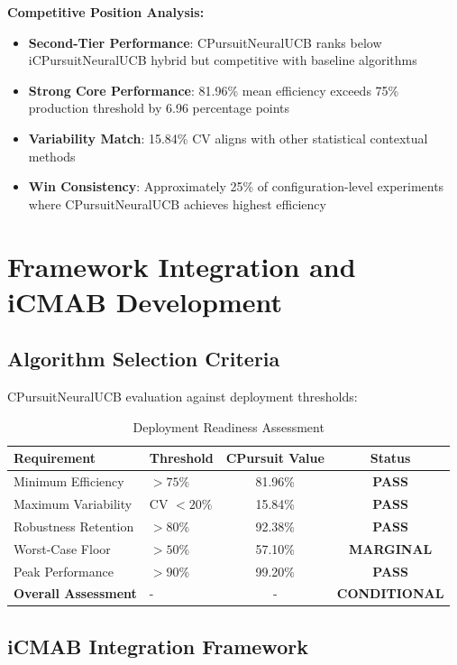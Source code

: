 \documentclass[12pt,a4paper]{article}
\newcommand{\primarytext}[1]{\textcolor{primaryblue}{\textbf{#1}}}
\newcommand{\secondarytext}[1]{\textcolor{secondaryblue}{\textbf{#1}}}
\newcommand{\success}[1]{\textcolor{accentgreen}{\textbf{#1}}}
\begin{document}
\textbf{Competitive Position Analysis:}
\begin{itemize}
\item \success{Second-Tier Performance}: CPursuitNeuralUCB ranks below iCPursuitNeuralUCB hybrid but competitive with baseline algorithms
\item \primarytext{Strong Core Performance}: 81.96\% mean efficiency exceeds 75\% production threshold by 6.96 percentage points
\item \secondarytext{Variability Match}: 15.84\% CV aligns with other statistical contextual methods
\item \success{Win Consistency}: Approximately 25\% of configuration-level experiments where CPursuitNeuralUCB achieves highest efficiency
\end{itemize}

\section{Framework Integration and iCMAB Development}

\subsection{Algorithm Selection Criteria}

CPursuitNeuralUCB evaluation against deployment thresholds:

\begin{table}[H]
\centering
\caption{Deployment Readiness Assessment}
\begin{tabular}{@{}llcc@{}}
\toprule
\textbf{Requirement} & \textbf{Threshold} & \textbf{CPursuit Value} & \textbf{Status} \\
\midrule
Minimum Efficiency & $>75\%$ & 81.96\% & \success{PASS} \\
Maximum Variability & CV $<20\%$ & 15.84\% & \success{PASS} \\
Robustness Retention & $>80\%$ & 92.38\% & \success{PASS} \\
Worst-Case Floor & $>50\%$ & 57.10\% & \success{MARGINAL} \\
Peak Performance & $>90\%$ & 99.20\% & \success{PASS} \\
\midrule
\textbf{Overall Assessment} & - & - & \success{CONDITIONAL} \\
\bottomrule
\end{tabular}
\end{table}

\subsection{iCMAB Integration Framework}
\end{document}
